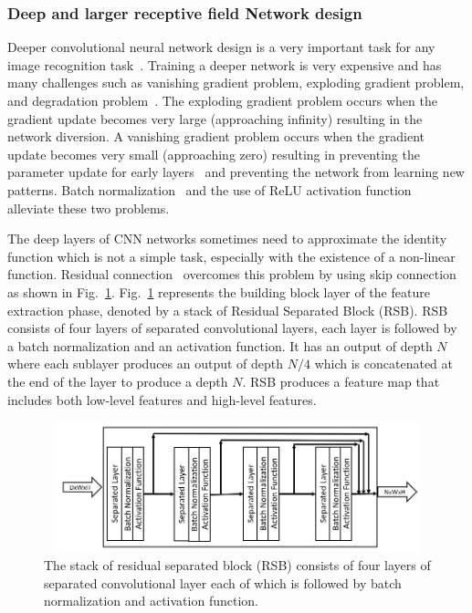 \subsubsection{ Deep and larger receptive field Network design}

Deeper convolutional neural network design is a very important task for any image recognition task~\cite{he2016deep}. Training a deeper network is very expensive and has many challenges such as vanishing gradient problem, exploding gradient problem, and degradation problem~\cite{he2016deep}. The exploding gradient problem occurs when the gradient update becomes very large (approaching infinity) resulting in the network diversion. A vanishing gradient problem occurs when the gradient update becomes very small (approaching zero) resulting in preventing the parameter update for early layers~\cite{ioffe2015batch} and preventing the network from learning new patterns. Batch normalization~\cite{ioffe2015batch} and the use of ReLU activation function~\cite{krizhevsky2012imagenet} alleviate these two problems.

The deep layers of CNN networks sometimes need to approximate the identity function which is not a simple task, especially with the existence of a non-linear function. Residual connection~\cite{he2016deep} overcomes this problem by using skip connection as shown in Fig.~\ref{fig4}.
Fig.~\ref{fig4} represents the building block layer of the feature extraction phase, denoted by a stack of Residual Separated Block  (RSB). RSB consists of four layers of separated convolutional layers, each layer is followed by a batch normalization and an activation function. It has an output of depth $N$ where each sublayer produces an output of depth $N/4$ which is concatenated at the end of the layer to produce a depth  $N$. RSB produces a feature map that includes both low-level features and high-level features.

\begin{figure}
\begin{center}
\includegraphics[height=38mm,width=14.0cm]{Figures/fig4.jpg}
\caption{The stack of residual separated block  (RSB) consists of four layers of separated convolutional layer each of which is followed by batch normalization and activation function.}
\label{fig4}
\end{center}
\end{figure}

